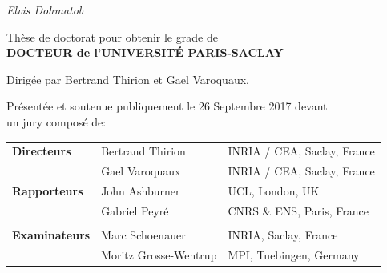 \documentclass[nobib, a4paper, notoc, twoside, justified, openany]{tufte-book}
\begin{document}
\begin{titlepage}
\begin{fullwidth}
\begin{center}


\vspace{3pc}
{\Huge \it Elvis Dohmatob} \\

\vspace{3pc}



{\LARGE Thèse de doctorat pour obtenir le grade de \ \\[1ex]
{\bf DOCTEUR de l'UNIVERSIT\'E PARIS-SACLAY} \ \\
}
\vspace{1pc}

{\LARGE Dirig\'ee par {Bertrand Thirion} et {Gael Varoquaux}.}

\vspace{1pc}


{\LARGE Présentée et soutenue publiquement le 26 Septembre 2017 devant \\ \vspace{10pt} un jury composé de:}

\vspace{1pc}

{\LARGE
\begin{tabular}{lll}
\vspace{1pc}
\textbf{Directeurs} & Bertrand Thirion & INRIA / CEA, Saclay, France \\
\vspace{1pc}
 & Gael Varoquaux & INRIA / CEA, Saclay, France \\
\vspace{1pc}
  \textbf{Rapporteurs} & John Ashburner  & UCL, London, UK  \\
  \vspace{1pc}  
& Gabriel Peyr\'e  & CNRS \& ENS, Paris, France  \\  \\
  \vspace{1pc}
\textbf{Examinateurs} & Marc Schoenauer & INRIA,  Saclay, France \\
  \vspace{1pc}
 & Moritz Grosse-Wentrup  & MPI, Tuebingen, Germany \\  
\end{tabular}
}

\end{center}
\end{fullwidth}
\end{titlepage}
\end{document}
